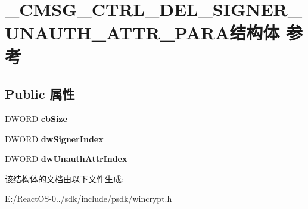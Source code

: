 \hypertarget{struct___c_m_s_g___c_t_r_l___d_e_l___s_i_g_n_e_r___u_n_a_u_t_h___a_t_t_r___p_a_r_a}{}\section{\+\_\+\+C\+M\+S\+G\+\_\+\+C\+T\+R\+L\+\_\+\+D\+E\+L\+\_\+\+S\+I\+G\+N\+E\+R\+\_\+\+U\+N\+A\+U\+T\+H\+\_\+\+A\+T\+T\+R\+\_\+\+P\+A\+R\+A结构体 参考}
\label{struct___c_m_s_g___c_t_r_l___d_e_l___s_i_g_n_e_r___u_n_a_u_t_h___a_t_t_r___p_a_r_a}
\subsection*{Public 属性}
\begin{DoxyCompactItemize}
\item 
\mbox{\label{struct___c_m_s_g___c_t_r_l___d_e_l___s_i_g_n_e_r___u_n_a_u_t_h___a_t_t_r___p_a_r_a_ab3d3ae54ed0335bdb32977c03bf8b48a}} 
D\+W\+O\+RD {\bfseries cb\+Size}
\item 
\mbox{\label{struct___c_m_s_g___c_t_r_l___d_e_l___s_i_g_n_e_r___u_n_a_u_t_h___a_t_t_r___p_a_r_a_af55812baeb545128c8ce0b08ee3aee37}} 
D\+W\+O\+RD {\bfseries dw\+Signer\+Index}
\item 
\mbox{\label{struct___c_m_s_g___c_t_r_l___d_e_l___s_i_g_n_e_r___u_n_a_u_t_h___a_t_t_r___p_a_r_a_ae4f62b8d54dd06c8aaa7641cdfe7db70}} 
D\+W\+O\+RD {\bfseries dw\+Unauth\+Attr\+Index}
\end{DoxyCompactItemize}


该结构体的文档由以下文件生成\+:\begin{DoxyCompactItemize}
\item 
E\+:/\+React\+O\+S-\/0../sdk/include/psdk/wincrypt.\+h\end{DoxyCompactItemize}
